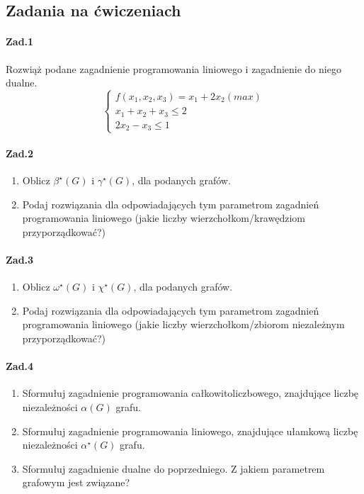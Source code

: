 \subsection{Zadania na ćwiczeniach}
\paragraph{Zad.1} Rozwiąż podane zagadnienie programowania liniowego i zagadnienie do niego dualne.
$$\left\{\begin{matrix}
f(x_1, x_2, x_3) = x_1 + 2x_2 (max)\\
x_1 + x_2 + x_3 \leq 2\\
2x_2 - x_3 \leq 1
\end{matrix}\right.$$

\paragraph{Zad.2}
\begin{enumerate}[label=\alph*)]
\item Oblicz $\beta ^\star (G)$  i $\gamma ^\star (G)$, dla podanych grafów.
\item Podaj rozwiązania dla odpowiadających tym parametrom zagadnień programowania liniowego (jakie liczby wierzchołkom/krawędziom przyporządkować?)
\end{enumerate}


\paragraph{Zad.3}
\begin{enumerate}[label=\alph*]
\item Oblicz $\omega ^\star (G)$ i $\chi ^\star (G)$, dla podanych grafów.
\item Podaj rozwiązania dla odpowiadających tym parametrom zagadnień programowania liniowego (jakie liczby wierzchołkom/zbiorom niezależnym przyporządkować?)
\end{enumerate}

\paragraph{Zad.4}
\begin{enumerate}
\item Sformułuj zagadnienie programowania całkowitoliczbowego, znajdujące liczbę niezależności $\alpha (G)$ grafu.
\item Sformułuj zagadnienie programowania liniowego, znajdujące ułamkową liczbę niezależności $\alpha ^\star(G)$ grafu.
\item Sformułuj zagadnienie dualne do poprzedniego. Z jakiem parametrem grafowym jest związane?
\end{enumerate}




